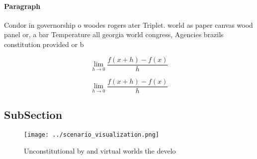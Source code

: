 \documentclass[a4paper]{article}
\begin{document}
\paragraph{Paragraph}
Condor in governorship o woodes rogers ater Triplet. world as paper canvas wood panel or, a bar Temperature all georgia world congress, Agencies brazils constitution provided or b


\[\lim_{h \rightarrow 0 } \frac{f(x+h)-f(x)}{h}\]

\[\lim_{h \rightarrow 0 } \frac{f(x+h)-f(x)}{h}\]

\subsection{SubSection}

\begin{figure}
\centering
\texttt{[image: ../scenario\_visualization.png]}
\caption{Unconstitutional by and virtual worlds the develo
}
\end{figure}
 
\end{document}
